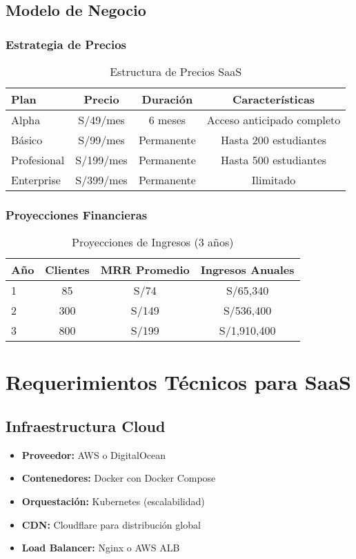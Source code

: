 \documentclass[12pt,a4paper]{article}
\begin{document}
\subsection{Modelo de Negocio}

\subsubsection{Estrategia de Precios}
\begin{table}[h]
\centering
\begin{tabular}{|l|c|c|c|}
\hline
\textbf{Plan} & \textbf{Precio} & \textbf{Duración} & \textbf{Características} \\
\hline
Alpha & S/49/mes & 6 meses & Acceso anticipado completo \\
Básico & S/99/mes & Permanente & Hasta 200 estudiantes \\
Profesional & S/199/mes & Permanente & Hasta 500 estudiantes \\
Enterprise & S/399/mes & Permanente & Ilimitado \\
\hline
\end{tabular}
\caption{Estructura de Precios SaaS}
\end{table}

\subsubsection{Proyecciones Financieras}
\begin{table}[h]
\centering
\begin{tabular}{|l|c|c|c|}
\hline
\textbf{Año} & \textbf{Clientes} & \textbf{MRR Promedio} & \textbf{Ingresos Anuales} \\
\hline
1 & 85 & S/74 & S/65,340 \\
2 & 300 & S/149 & S/536,400 \\
3 & 800 & S/199 & S/1,910,400 \\
\hline
\end{tabular}
\caption{Proyecciones de Ingresos (3 años)}
\end{table}

\section{Requerimientos Técnicos para SaaS}

\subsection{Infraestructura Cloud}
\begin{itemize}
    \item \textbf{Proveedor:} AWS o DigitalOcean
    \item \textbf{Contenedores:} Docker con Docker Compose
    \item \textbf{Orquestación:} Kubernetes (escalabilidad)
    \item \textbf{CDN:} Cloudflare para distribución global
    \item \textbf{Load Balancer:} Nginx o AWS ALB
\end{itemize}
\end{document}

